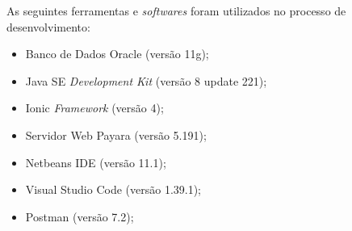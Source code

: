 As seguintes ferramentas e \textit{softwares} foram utilizados no processo de desenvolvimento:

\begin{itemize}
    \item Banco de Dados Oracle (versão 11g);
    \item Java SE \textit{Development Kit} (versão 8 update 221);
    \item Ionic \textit{Framework} (versão 4);
    \item Servidor Web Payara (versão 5.191);
    \item Netbeans IDE (versão 11.1);
    \item Visual Studio Code (versão 1.39.1);
    \item Postman (versão 7.2);
\end{itemize}